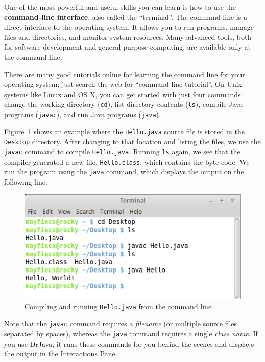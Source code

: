 
One of the most powerful and useful skills you can learn is how to use the {\bf command-line interface}, also called the ``terminal''.
The command line is a direct interface to the operating system.
It allows you to run programs, manage files and directories, and monitor system resources.
Many advanced tools, both for software development and general purpose computing, are available only at the command line.

There are many good tutorials online for learning the command line for your operating system; just search the web for ``command line tutorial''.
On Unix systems like Linux and OS X, you can get started with just four commands: change the working directory ({\tt cd}), list directory contents ({\tt ls}), compile Java programs ({\tt javac}), and run Java programs ({\tt java}).

Figure~\ref{fig.terminal} shows an example where the {\tt Hello.java} source file is stored in the {\tt Desktop} directory.
After changing to that location and listing the files, we use the {\tt javac} command to compile {\tt Hello.java}.
Running {\tt ls} again, we see that the compiler generated a new file, {\tt Hello.class}, which contains the byte code.
We run the program using the {\tt java} command, which displays the output on the following line.

\begin{figure}[!ht]
\begin{center}
\includegraphics[width=4.5in]{figs/terminal.png}
\caption{Compiling and running {\tt Hello.java} from the command line.}
\label{fig.terminal}
\end{center}
\end{figure}

Note that the {\tt javac} command requires a {\em filename} (or multiple source files separated by spaces), whereas the {\tt java} command requires a single {\em class name}.
If you use DrJava, it runs these commands for you behind the scenes and displays the output in the Interactions Pane.

